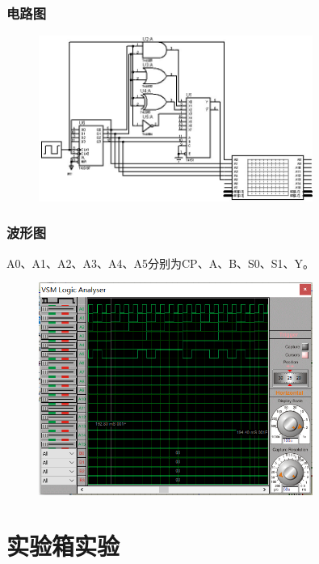 \documentclass[UTF8, a4paper, 11pt]{article}
\begin{document}
\subsubsection{电路图}
\begin{figure}[H]
    \centering
    \includegraphics[width=0.8\textwidth]{ex6.3电路图.jpg}
\end{figure}
\subsubsection{波形图}
A0、A1、A2、A3、A4、A5分别为CP、A、B、S0、S1、Y。
\begin{figure}[H]
    \centering
    \includegraphics[width=0.8\textwidth]{ex6.3波形图.png}
\end{figure}
\section{实验箱实验}
\end{document}

